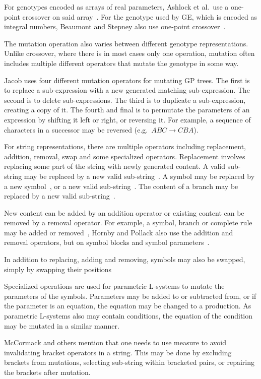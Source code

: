 For genotypes encoded as arrays of real parameters, Ashlock et al.\ use a one-point crossover on said array~\cite{2006Ashlock}.
For the genotype used by \gls{GE}, which is encoded as integral numbers, Beaumont and Stepney also use one-point crossover~\cite{2009Beaumont}.

The mutation operation also varies between different genotype representations.
Unlike crossover, where there is in most cases only one operation, mutation often includes multiple different operators that mutate the genotype in some way.

Jacob uses four different mutation operators for mutating \gls{GP} trees.
The first is to replace a sub-expression with a new generated matching sub-expression.
The second is to delete sub-expressions.
The third is to duplicate a sub-expression, creating a copy of it.
The fourth and final is to permutate the parameters of an expression by shifting it left or right, or reversing it.
For example, a sequence of characters in a successor may be reversed (e.g.\ $ABC \rightarrow CBA$).~\cite{1994Jacob, 1995Jacob}

For string representations, there are multiple operators including replacement, addition, removal, swap and some specialized operators.
Replacement involves replacing some part of the string with newly generated content.
A valid sub-string may be replaced by a new valid sub-string~\cite{1998Mock, 2009Corchado}.
A symbol may be replaced by a new symbol~\cite{2001Hornby, 2002Ebner, 2003Ebner, 2009Corchado, 2013Ding}, or a new valid sub-string~\cite{1998Ochoa}.
The content of a branch may be replaced by a new valid sub-string~\cite{1998Ochoa}.

New content can be added by an addition operator or existing content can be removed by a removal operator.
For example, a symbol, branch or complete rule may be added or removed~\cite{2002Ebner, 2003Ebner},
Hornby and Pollack also use the addition and removal operators, but on symbol blocks and symbol parameters~\cite{2001Hornby}.

In addition to replacing, adding and removing, symbols may also be swapped, simply by swapping their positions~\cite{2002Ebner, 2003Ebner}

Specialized operations are used for parametric \glspl{L-system} to mutate the parameters of the symbols.
Parameters may be added to or subtracted from, or if the parameter is an equation, the equation may be changed to a production.
As parametric \glspl{L-system} also may contain conditions, the equation of the condition may be mutated in a similar manner.~\cite{2001Hornby}

McCormack and others mention that one needs to use measure to avoid invalidating bracket operators in a string.
This may be done by excluding brackets from mutations, selecting sub-string within bracketed pairs, or repairing the brackets after mutation.~\cite{2004McCormack}
